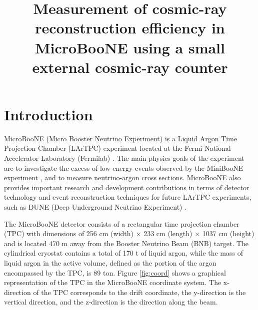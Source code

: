 \documentclass[a4paper,11pt]{article}
\title{\boldmath Measurement of cosmic-ray reconstruction efficiency in MicroBooNE using a small external cosmic-ray counter}
\begin{document}
\maketitle
\flushbottom

\section{Introduction}
\label{sec:intro}
MicroBooNE (Micro Booster Neutrino Experiment) is a Liquid Argon Time Projection Chamber (LArTPC) experiment located at the Fermi National Accelerator Laboratory (Fermilab) \cite{detector}. The main physics goals of the experiment are to investigate the excess of low-energy events observed by the MiniBooNE experiment \cite{miniboone}, and to measure neutrino-argon cross sections. MicroBooNE also provides important research and development contributions in terms of detector technology and event reconstruction techniques for future LArTPC experiments, such as DUNE (Deep Underground Neutrino Experiment) \cite{dune}.

The MicroBooNE detector  consists of a rectangular time projection chamber (TPC) with dimensions of 256 cm (width) $\times$ 233 cm (length) $\times$ 1037 cm (height) and is located 470 m away from the Booster Neutrino Beam (BNB) target.  The cylindrical cryostat contains a total of 170 t of liquid argon, while the mass of liquid argon in the active volume, defined as the portion of the argon encompassed by the TPC, is 89 ton. Figure \ref{fig:coord} shows a graphical representation of the TPC in the MicroBooNE coordinate system. The x-direction of the TPC corresponds to the drift coordinate, the y-direction is the vertical direction, and the z-direction is the direction along the beam.
\end{document}

